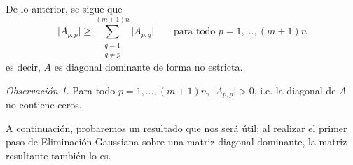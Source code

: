 \documentclass[11pt, a4paper, spanish]{article}
\theoremstyle{plain}
\theoremstyle{remark}
\newtheorem{obs}{Observación}
\begin{document}
      De lo anterior, se sigue que
        \[ \vert A_{p,p} \vert \geq \sum_{\substack{q=1 \\ q \neq p}}^{(m+1)n} \vert A_{p,q} \vert \qquad \text{para todo $p = 1, \dots, (m+1)n$} \]
      es decir, $A$ es diagonal dominante de forma no estricta.

      \begin{obs}
        \label{obs:Diagonal de A sin ceros}
        Para todo $p = 1, \dots, (m+1)n$, $\vert A_{p,p} \vert > 0$, i.e. la diagonal de $A$ no contiene ceros.
      \end{obs}

      A continuación, probaremos un resultado que nos será útil: al realizar el primer paso de Eliminación Gaussiana sobre una matriz diagonal dominante, la matriz resultante también lo es.
\end{document}
